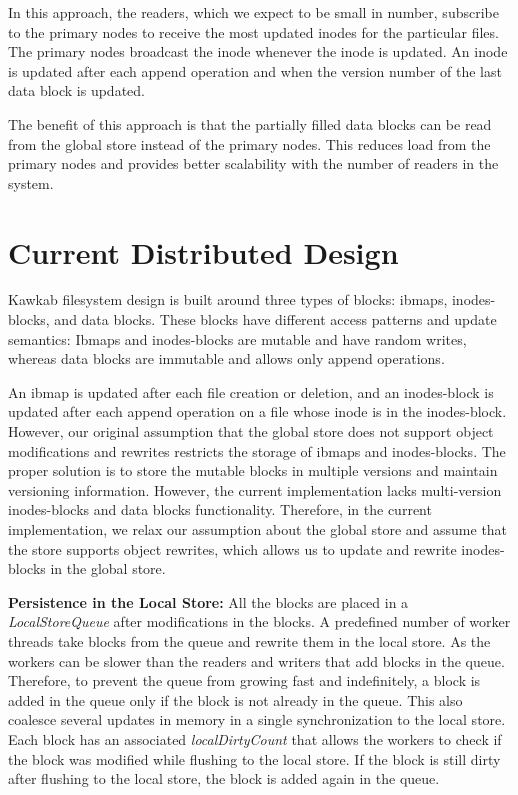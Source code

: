 \documentclass[]{article}
\newcommand{\subtopic}[1]{\vspace{1.5pt} \noindent \textbf{#1}}
\begin{document}
In this approach, the readers, which we expect to be small in number, subscribe
to the primary nodes to receive the most updated inodes for the particular
files. The primary nodes broadcast the inode whenever the inode is updated. An
inode is updated after each append operation and when the version number of the
last data block is updated.

The benefit of this approach is that the partially filled data blocks
can be read from the global store instead of the primary nodes. This reduces
load from the primary nodes and provides better scalability with the number
of readers in the system.



\section{Current Distributed Design}

Kawkab filesystem design is built around three types of blocks: ibmaps,
inodes-blocks, and data blocks. These blocks have different access patterns and
update semantics: Ibmaps and inodes-blocks are mutable and have random writes,
whereas data blocks are immutable and allows only append operations. 

An ibmap is updated after each file creation or deletion, and an inodes-block
is updated after each append operation on a file whose inode is in the
inodes-block.  However, our original assumption that the global store does not
support object modifications and rewrites restricts the storage of ibmaps and
inodes-blocks. The proper solution is to store the mutable blocks in multiple
versions and maintain versioning information. However, the current
implementation lacks multi-version inodes-blocks and data blocks functionality.
Therefore, in the current implementation, we relax our assumption about the
global store and assume that the store supports object rewrites, which allows
us to update and rewrite inodes-blocks in the global store.



\subtopic{Persistence in the Local Store:} All the blocks are placed in a
\textit{LocalStoreQueue} after modifications in the blocks. A predefined number
of worker threads take blocks from the queue and rewrite them in the local
store.  As the workers can be slower than the readers and writers that add
blocks in the queue. Therefore, to prevent the queue from growing fast and
indefinitely, a block is added in the queue only if the block is not already in
the queue. This also coalesce several updates in memory in a single
synchronization to the local store.  Each block has an associated
\textit{localDirtyCount} that allows the workers to check if the block was modified
while flushing to the local store. If the block is still dirty after flushing
to the local store, the block is added again in the queue. 
\end{document}
